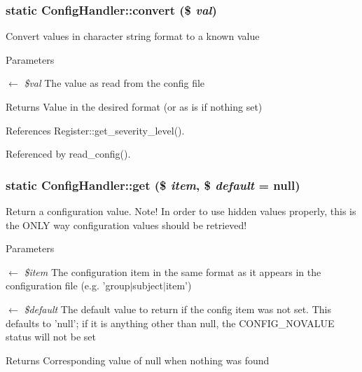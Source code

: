 \subsubsection[{convert}]{\setlength{\rightskip}{0pt plus 5cm}static ConfigHandler::convert (\$ {\em val})}\label{classConfigHandler_a9851c66d75db6a65c64aba5192173c14}
Convert values in character string format to a known value


\begin{DoxyParams}{Parameters}
\item[\mbox{$\leftarrow$} {\em \$val}]The value as read from the config file \end{DoxyParams}
\begin{DoxyReturn}{Returns}
Value in the desired format (or as is if nothing set) 
\end{DoxyReturn}


References Register::get\_\-severity\_\-level().



Referenced by read\_\-config().

\subsubsection[{get}]{\setlength{\rightskip}{0pt plus 5cm}static ConfigHandler::get (\$ {\em item}, \/  \$ {\em default} = {\ttfamily null})}\label{classConfigHandler_aa8f6a7516588561626efccb8be5875ce}
Return a configuration value. Note! In order to use hidden values properly, this is the ONLY way configuration values should be retrieved!


\begin{DoxyParams}{Parameters}
\item[\mbox{$\leftarrow$} {\em \$item}]The configuration item in the same format as it appears in the configuration file (e.g. 'group$|$subject$|$item') \item[\mbox{$\leftarrow$} {\em \$default}]The default value to return if the config item was not set. This defaults to 'null'; if it is anything other than null, the CONFIG\_\-NOVALUE status will not be set \end{DoxyParams}
\begin{DoxyReturn}{Returns}
Corresponding value of null when nothing was found 
\end{DoxyReturn}


